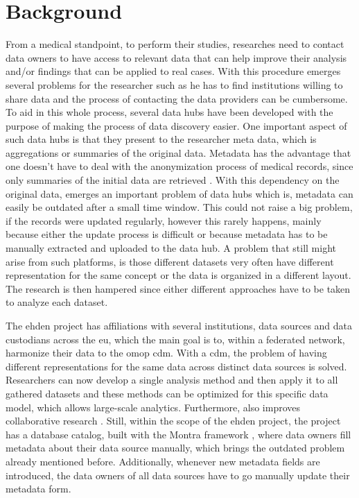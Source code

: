 \chapter{Background}
\label{chapter:background}

From a medical standpoint, to perform their studies, researches need to contact data
owners to have access to relevant data that can help improve their analysis and/or
findings that can be applied to real cases.
With this procedure emerges several problems for the researcher such as he has to find
institutions willing to share data and the process of contacting the data providers can
be cumbersome.
To aid in this whole process, several data hubs have been developed with the purpose of
making the process of data discovery easier.
One important aspect of such data hubs is that they present to the researcher meta
data, which is aggregations or summaries of the original data.
Metadata has the advantage that one doesn't have to deal with the anonymization process
of medical records, since only summaries of the initial data are retrieved
\cite{egenvar, montra}.
With this dependency on the original data, emerges an important problem of data hubs
which is, metadata can easily be outdated after a small time window.
This could not raise a big problem, if the records were updated regularly, however this
rarely happens, mainly because either the update process is difficult or because
metadata has to be manually extracted and uploaded to the data hub.
A problem that still might arise from such platforms, is those different datasets very
often have different representation for the same concept or the data is organized in a
different layout.
The research is then hampered since either different approaches have to be taken to
analyze each dataset.

The \gls{ehden} project has affiliations with several institutions, data sources and
data custodians across the \gls{eu}, which the main goal is to, within a federated
network, harmonize their data to the \gls{omop} \gls{cdm}\cite{ehden-datapartners}.
With a \gls{cdm}, the problem of having different representations for the same data
across distinct data sources is solved.
Researchers can now develop a single analysis method and then apply it to all gathered
datasets and these methods can be optimized for this specific data model, which allows
large-scale analytics.
Furthermore, also improves collaborative research \cite{ohdsi-site}.
Still, within the scope of the \gls{ehden} project, the project has a database catalog,
built with the Montra framework \cite{montra}, where data owners fill metadata about
their data source manually, which brings the outdated problem already mentioned before.
Additionally, whenever new metadata fields are introduced, the data owners of all data
sources have to go manually update their metadata form.

